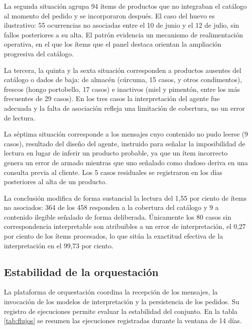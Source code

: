 La segunda situación agrupa 94 ítems de productos que no integraban el catálogo al momento del pedido y se incorporaron después. El caso del huevo es ilustrativo: 55 ocurrencias no asociadas entre el 10 de junio y el 12 de julio, sin fallos posteriores a su alta. El patrón evidencia un mecanismo de realimentación operativa, en el que los ítems que el panel destaca orientan la ampliación progresiva del catálogo.

La tercera, la quinta y la sexta situación corresponden a productos ausentes del catálogo o dados de baja: de almacén (cúrcuma, 15 casos, y otros condimentos), frescos (hongo portobello, 17 casos) e inactivos (miel y pimentón, entre los más frecuentes de 29 casos). En los tres casos la interpretación del agente fue adecuada y la falta de asociación refleja una limitación de cobertura, no un error de lectura.

La séptima situación corresponde a los mensajes cuyo contenido no pudo leerse (9 casos), resultado del diseño del agente, instruido para señalar la imposibilidad de lectura en lugar de inferir un producto probable, ya que un ítem incorrecto genera un error de armado mientras que uno señalado como dudoso deriva en una consulta previa al cliente. Los 5 casos residuales se registraron en los días posteriores al alta de un producto.

La conclusión modifica de forma sustancial la lectura del 1,55 por ciento de ítems no asociados: 364 de los 458 responden a la cobertura del catálogo y 9 a contenido ilegible señalado de forma deliberada. Únicamente los 80 casos sin correspondencia interpretable son atribuibles a un error de interpretación, el 0,27 por ciento de los ítems procesados, lo que sitúa la exactitud efectiva de la interpretación en el 99,73 por ciento.

\subsection{Estabilidad de la orquestación}
\label{subsec:estabilidad_orquestacion}

La plataforma de orquestación coordina la recepción de los mensajes, la invocación de los modelos de interpretación y la persistencia de los pedidos. Su registro de ejecuciones permite evaluar la estabilidad del conjunto. En la tabla \ref{tab:flujos} se resumen las ejecuciones registradas durante la ventana de 14 días.

